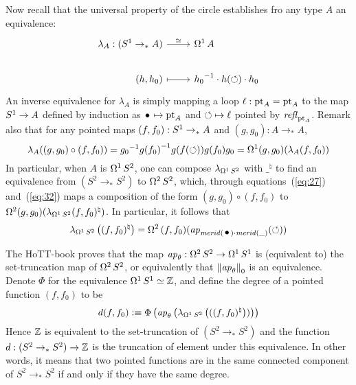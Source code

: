 \documentclass[english,a4]{article}
\newcommand{\Sp}{{S^2}}%
\newcommand{\mrd}{\mathit{merid}}%
\newcommand{\Truncset}[1]{{\Trunc{#1}}_0}%
\newcommand{\ptdto}{\to_\ast}%
\def\blank{\_}%
\begin{document}
Now recall that the universal property of the circle establishes fro
any type $A$ an equivalence:
\begin{equation}
  \label{eq:25}
  \begin{tikzcd}[%
    /tikz/column 1/.append style={anchor=base east},%
    /tikz/column 2/.append style={anchor=base west}]
    \lambda_{A}: (\Sc \ptdto A) \rar["\weq"] & \loopspace 1 A
    \\
    (h,h_0) \rar[mapsto] & \inv{h_0} \cdot h(\Sloop)\cdot h_0
  \end{tikzcd}
\end{equation}
An inverse equivalence for $\lambda_A$ is simply mapping a loop
$\ell : {\mathord{\mathrm{pt}}}_A = {\mathord{\mathrm{pt}}}_A$ to the map ${S^1} \to A$ defined by induction as
$\base \mapsto \pt_A$ and $\mathord{\circlearrowleft} \mapsto \ell$ pointed by
$\mathop{{\mathit{refl}}_{{\mathord{\mathrm{pt}}}_A}}$. Remark also that for any pointed maps
$(f,f_0):\Sc \ptdto A$ and $(g,g_0):A \ptdto A$,
\begin{equation}
  \label{eq:32}
  \lambda_A((g,g_0)\circ (f,f_0)) = {g_0}^{-1} {g(f_0)}^{-1} g(f(\mathord{\circlearrowleft})) g(f_0) g_0
  = \mathop{\Omega^{1}} (g,g_0) ( \lambda_A(f,f_0) )
\end{equation}
In particular, when $A$ is $\loopspace 1 \Sp$, one can compose
$\lambda_{\loopspace 1 \Sp}$ with $\blank^\natural$ to find an
equivalence from $(\Sp \ptdto \Sp)$ to $\loopspace 2 \Sp$, which,
through equations~(\ref{eq:27}) and~(\ref{eq:32}) maps a composition
of the form $(g,g_0)\circ (f,f_0)$ to
$\loopspace 2 (g,g_0)(\lambda_{\loopspace 1 \Sp}(f,f_0)^\natural)$. In
particular, it follows that
\begin{equation}
  \label{eq:34}
  \lambda_{\loopspace 1 \Sp}\left((f,f_0)^\natural\right) = \loopspace 2 {(f,f_0)} (\ap{\mrd(\base)\cdot \mrd(\blank)}(\Sloop))
\end{equation}

The HoTT-book proves that the map
$\ap \theta:\loopspace 2 \Sp \to \loopspace 1 \Sc$ is (equivalent to)
the set-truncation map of $\loopspace 2 \Sp$, or equivalently that
$\Truncset {\ap \theta}$ is an equivalence. Denote $\Phi$ for the
equivalence $\mathop{\Omega^{1}} {S^1} \simeq \mathbb{Z}$, and define the degree of a
pointed function $(f,f_0)$ to be
\begin{equation}
  \label{eq:28}
  d(f,f_0) \defequi \Phi\left(\ap\theta\left(
      \lambda_{\loopspace 1 \Sp}\left(((f,f_0)^\natural\right))
    \right)\right)
\end{equation}
Hence $\mathbb{Z}$ is equivalent to the set-truncation of $(\Sp \ptdto \Sp)$
and the function $d: (\Sp \ptdto \Sp) \to \ZZ$ is the truncation of
element under this equivalence. In other words, it means that two
pointed functions are in the same connected component of
$\Sp \ptdto \Sp$ if and only if they have the same degree.
\end{document}
